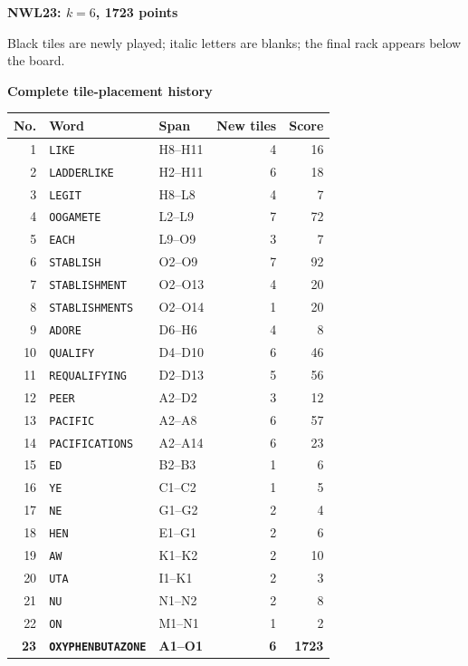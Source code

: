 \documentclass[letterpaper]{article}
\begin{document}
\vfill
\clearpage
\begin{center}
{\fontsize{11}{12}\selectfont\bfseries NWL23: $k=6$, 1723 points\par}
\vspace{2pt}
\par
\vspace{1pt}
{\fontsize{7.2}{8}\selectfont Black tiles are newly played; italic letters are blanks; the final rack appears below the board.\par}
\vspace{2pt}
{\fontsize{8.5}{9}\selectfont\bfseries Complete tile-placement history\par}
\end{center}
\begin{center}
\fontsize{8}{8.3}\selectfont
\setlength{\tabcolsep}{4pt}
\renewcommand{\arraystretch}{0.84}
\begin{tabular}{@{}rllrr@{}}\toprule
No. & Word & Span & New tiles & Score\\
\midrule
1 & \texttt{LIKE} & H8--H11 & 4 & 16\\
2 & \texttt{LADDERLIKE} & H2--H11 & 6 & 18\\
3 & \texttt{LEGIT} & H8--L8 & 4 & 7\\
4 & \texttt{OOGAMETE} & L2--L9 & 7 & 72\\
5 & \texttt{EACH} & L9--O9 & 3 & 7\\
6 & \texttt{STABLISH} & O2--O9 & 7 & 92\\
7 & \texttt{STABLISHMENT} & O2--O13 & 4 & 20\\
8 & \texttt{STABLISHMENTS} & O2--O14 & 1 & 20\\
9 & \texttt{ADORE} & D6--H6 & 4 & 8\\
10 & \texttt{QUALIFY} & D4--D10 & 6 & 46\\
11 & \texttt{REQUALIFYING} & D2--D13 & 5 & 56\\
12 & \texttt{PEER} & A2--D2 & 3 & 12\\
13 & \texttt{PACIFIC} & A2--A8 & 6 & 57\\
14 & \texttt{PACIFICATIONS} & A2--A14 & 6 & 23\\
15 & \texttt{ED} & B2--B3 & 1 & 6\\
16 & \texttt{YE} & C1--C2 & 1 & 5\\
17 & \texttt{NE} & G1--G2 & 2 & 4\\
18 & \texttt{HEN} & E1--G1 & 2 & 6\\
19 & \texttt{AW} & K1--K2 & 2 & 10\\
20 & \texttt{UTA} & I1--K1 & 2 & 3\\
21 & \texttt{NU} & N1--N2 & 2 & 8\\
22 & \texttt{ON} & M1--N1 & 1 & 2\\
\midrule
\textbf{23} & \textbf{\texttt{OXYPHENBUTAZONE}} & \textbf{A1--O1} & \textbf{6} & \textbf{1723}\\
\bottomrule\end{tabular}
\end{center}
\end{document}
